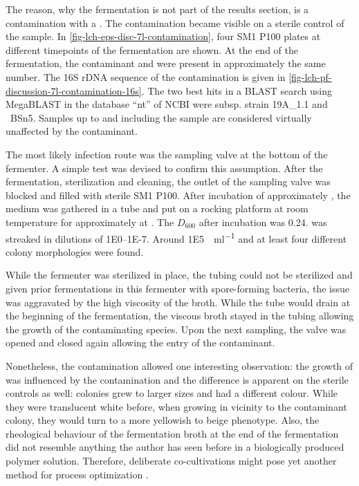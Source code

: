 The reason, why the  fermentation is not part of the results section, is a contamination with a . The contamination became visible on a sterile control of the  sample. In \vref{fig-lch-eps-disc-7l-contamination}, four SM1 P100 plates at different timepoints of the fermentation are shown. At the end of the fermentation, the contaminant and \strain{} were present in approximately the same number. The 16S rDNA sequence of the contamination is given in \vref{fig-lch-pf-discussion-7l-contamination-16s}. The two best hits in a BLAST search using MegaBLAST in the database \enquote{nt} of NCBI were  subsp.  strain 19A\_1.1 and ~BSn5. Samples up to and including the  sample are considered virtually unaffected by the contaminant.

The most likely infection route was the sampling valve at the bottom of the fermenter. A simple test was devised to confirm this assumption. %
After the fermentation, sterilization and cleaning, the outlet of the sampling valve was blocked and filled with sterile SM1 P100. After incubation of approximately , the medium was gathered in a  tube and put on a rocking platform at room temperature for approximately  at . The $D_{600}$ after incubation was \num{0.24}.  was streaked in dilutions of \numrange[scientific-notation = true, retain-unity-mantissa = false, retain-zero-exponent = true]{1E0}{1E-7}. Around \SI[retain-unity-mantissa = false]{1E5}{\CFU\per\milli\litre} and at least four different colony morphologies were found.

While the fermenter was sterilized in place, the tubing could not be sterilized and given prior fermentations in this fermenter with spore-forming bacteria, the issue was aggravated by the high viscosity of the broth. While the tube would drain at the beginning of the fermentation, the viscous broth stayed in the tubing allowing the growth of the contaminating species. Upon the next sampling, the valve was opened and closed again allowing the entry of the contaminant.

Nonetheless, the contamination allowed one interesting observation: the growth of \strain{} was influenced by the contamination and the difference is apparent on the sterile controls as well: colonies grew to larger sizes and had a different colour. While they were translucent white before, when growing in vicinity to the contaminant colony, they would turn to a more yellowish to beige phenotype. Also, the rheological behaviour of the fermentation broth at the end of the fermentation did not resemble anything the author has seen before in a biologically produced polymer solution. Therefore, deliberate co-cultivations might pose yet another method for process optimization \cite{Bader2010}.

